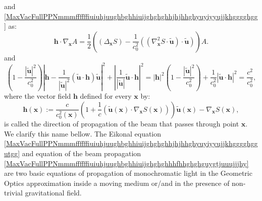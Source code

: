 \documentclass{article}
\theoremstyle{definition}
\theoremstyle{remark}
\renewcommand{\vec}[1]{\mathbf{#1}}
\newcommand{\er}{\eqref}
\newcommand{\er}{\eqref}
\begin{document}
and
\er{MaxVacFullPPNmmmffffffiuiuhjuughbghhiuijghghghhjhjhhghyuyiyyujjkhgggghgg}
as:
\begin{equation}\label{MaxVacFullPPNmmmffffffiuiuhjuughbghhiuijghghghhhfhhghghguygtjuuujjjhy}
\vec h\cdot\nabla_{\vec x}A=\frac{1}{2}\left(\left(\Delta_{\vec
x}S\right)-\frac{1}{c^2_0}\left(\left(\nabla^2_{\vec x}S\cdot\vec
{\tilde u}\right)\cdot\vec {\tilde u}\right)\right)A.
\end{equation}
and
\begin{equation}\label{MaxVacFullPPNmmmffffffiuiuhjuughbghhiuijghghghhjhjhhghyuyiyyujjkhgggghggutgg}
\left(1-\frac{\left|\vec {\tilde
u}\right|^2}{c^2_0}\right)\left|\vec h-\frac{1}{\left|\vec {\tilde
u}\right|^2}\left(\vec {\tilde u}\cdot\vec h\right)\vec {\tilde
u}\right|^2+\left|\frac{1}{\left|\vec {\tilde u}\right|}\vec {\tilde
u}\cdot\vec h\right|^2=\left|\vec h\right|^2\left(1-\frac{\left|\vec
{\tilde u}\right|^2}{c^2_0}\right)+\frac{1}{c^2_0}\left|\vec {\tilde
u}\cdot\vec h\right|^2= \frac{c^2}{c^2_0},
\end{equation}
where the vector field $\vec h$ defined for every $\vec x$ by:
\begin{equation}\label{MaxVacFullPPNmmmffffffiuiuhjuughbghhiuijghghghhhfhhghghguygtjuuujjjkyuuyhh}
\vec h(\vec x):=\frac{c}{c^2_0(\vec x)}\left(1+\frac{1}{c}\left(\vec
{\tilde u(\vec x)}\cdot\nabla_{\vec x}S(\vec x)\right)\right)\vec
{\tilde u}(\vec x)-\nabla_{\vec x}S(\vec x),
\end{equation}
is called the direction of propagation of the beam that passes
through point $\vec x$. We clarify this name bellow.
The Eikonal equation
\er{MaxVacFullPPNmmmffffffiuiuhjuughbghhiuijghghghhjhjhhghyuyiyyujjkhgggghggutgg}
and equation of the beam propagation
\er{MaxVacFullPPNmmmffffffiuiuhjuughbghhiuijghghghhhfhhghghguygtjuuujjjhy}
are two basic equations of propagation of monochromatic light in the
Geometric Optics approximation inside a moving medium or/and in the
presence of non-trivial gravitational field.
\end{document}
